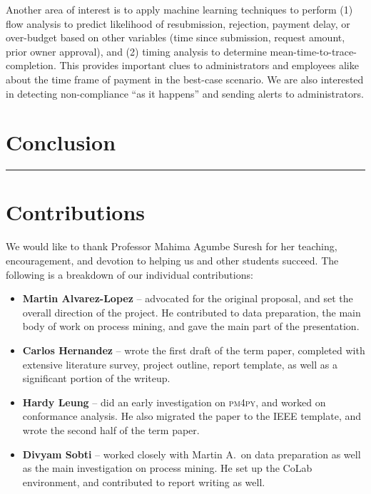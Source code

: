 \documentclass[conference]{IEEEtran}
\begin{document}
Another area of interest is to apply machine learning techniques to
perform (1) flow analysis to predict likelihood of resubmission,
rejection, payment delay, or over-budget based on other variables (time
since submission, request amount, prior owner approval), and (2) timing
analysis to determine mean-time-to-trace-completion. This provides
important clues to administrators and employees alike about the time
frame of payment in the best-case scenario. We are also interested in
detecting non-compliance ``as it happens'' and sending alerts to
administrators.

\section{Conclusion}
\label{section-conclusion}


{}

\begin{center}
\noindent\rule{0.5\columnwidth}{0.4pt}
\end{center}

\section{Contributions}

We would like to thank Professor Mahima Agumbe Suresh for her teaching,
encouragement, and devotion to helping us and other students succeed.
The following is a breakdown of our individual contributions:

\begin{itemize}
\item \textbf{Martin Alvarez-Lopez} -- advocated for the original proposal,
and set the overall direction of the project. He contributed to
data preparation, the main body of work on process mining, and gave the main
part of the presentation.

\item
\textbf{Carlos Hernandez} -- wrote the first draft of the term paper,
completed with extensive literature survey, project outline,
report template, as well as a significant portion of the writeup.

\item
\textbf{Hardy Leung} -- did an early investigation on \textsc{pm4py}, and
worked on conformance analysis. He also migrated the paper to the IEEE
template, and wrote the second half of the term paper.

\item
\textbf{Divyam Sobti} -- worked closely with Martin A.~on data preparation as
well as the main investigation on process mining. He set up the CoLab
environment, and contributed to report writing as well.

\end{itemize}
\end{document}
